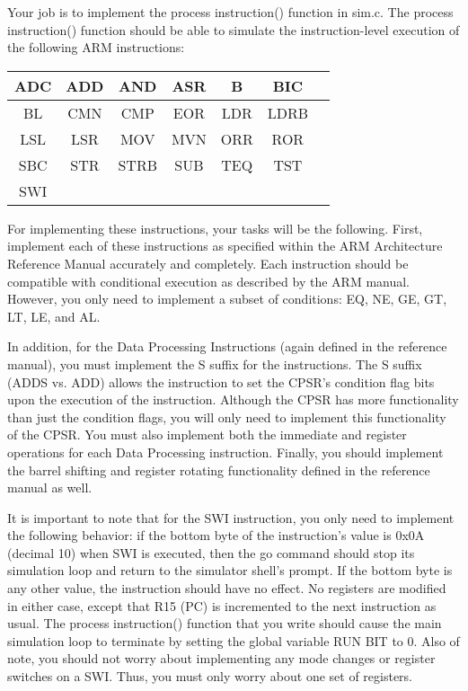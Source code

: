 \documentclass{article}
\begin{document}
Your job is to implement the process instruction() function in
sim.c. The process instruction() function should be able to simulate
the instruction-level execution of the following ARM instructions:

\begin{center}
\begin{tabular}{|c|c|c|c|c|c|c|} 
\hline
ADC  & ADD  & AND  & ASR  & B    & BIC  \\ \hline
BL   & CMN  & CMP  & EOR  & LDR  & LDRB \\ \hline
LSL  & LSR  & MOV  & MVN  & ORR  & ROR  \\ \hline
SBC  & STR  & STRB & SUB  & TEQ  & TST  \\ \hline
SWI  &      &      &      &      &      \\ \hline
\end{tabular}
\end{center}
For implementing these instructions, your tasks will be the
following. First, implement each of these instructions as specified
within the ARM Architecture Reference Manual accurately and
completely. 
Each instruction should be compatible with conditional
execution as described by the ARM manual. However, you only need to
implement a subset of conditions: EQ, NE, GE, GT, LT, LE, and AL.

In addition, for the Data Processing Instructions (again defined in
the reference manual), you must implement the S suffix for the
instructions. The S suffix (ADDS vs. ADD) allows the instruction to
set the CPSR's condition flag bits upon the execution of the
instruction. Although the CPSR has more functionality than just the
condition flags, you will only need to implement this functionality of
the CPSR. You must also implement both the immediate and register
operations for each Data Processing instruction. Finally, you should
implement the barrel shifting and register rotating functionality
defined in the reference manual as well.

It is important to note that for the SWI instruction, you only need to
implement the
following behavior: if the bottom byte of the instruction's value is
0x0A (decimal 10) when SWI is executed, then the go command should
stop its simulation loop and return to the simulator shell's
prompt. If the bottom byte is any other value, the instruction should
have no effect. No registers are modified in either case, except that
R15 (PC) is incremented to the next instruction as usual. The process
instruction() function that you write should cause the main simulation
loop to terminate by setting the global variable RUN BIT to 0. Also of
note, you should not worry about implementing any mode changes or
register switches on a SWI. Thus, you must only worry about one set of
registers.  
\end{document}
